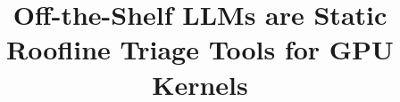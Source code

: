 \documentclass[conference]{IEEEtran}
\begin{document}
\newcommand{\textitbf}[1]{\textbf{\textit{#1}}}

\title{Off-the-Shelf LLMs are Static Roofline Triage Tools for GPU Kernels\\


}

 \author{
 }
 
\end{document}
